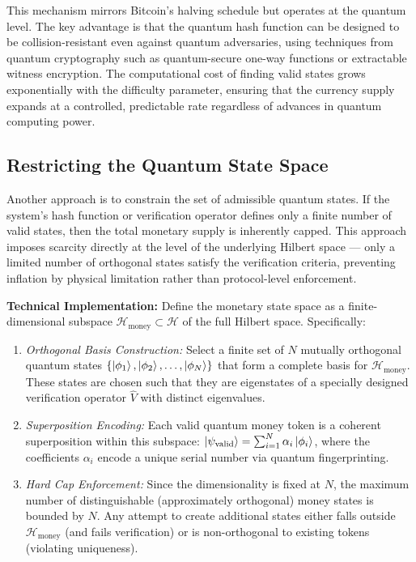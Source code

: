 \documentclass[a4paper,10.5pt,twoside]{article}
\begin{document}
This mechanism mirrors Bitcoin's halving schedule but operates at the quantum level. The key advantage is that the quantum hash function can be designed to be collision-resistant even against quantum adversaries, using techniques from quantum cryptography such as quantum-secure one-way functions or extractable witness encryption. The computational cost of finding valid states grows exponentially with the difficulty parameter, ensuring that the currency supply expands at a controlled, predictable rate regardless of advances in quantum computing power.

\subsection{Restricting the Quantum State Space}\label{s:3.2}
Another approach is to constrain the set of admissible quantum states. If the system's hash function or verification operator defines only a finite number of valid states, then the total monetary supply is inherently capped. This approach imposes scarcity directly at the level of the underlying Hilbert space — only a limited number of orthogonal states satisfy the verification criteria, preventing inflation by physical limitation rather than protocol-level enforcement.

\textbf{Technical Implementation:} Define the monetary state space as a finite-dimensional subspace $\mathcal{H}_{\text{money}} \subset \mathcal{H}$ of the full Hilbert space. Specifically:
\begin{enumerate}
\item \textit{Orthogonal Basis Construction:} Select a finite set of $N$ mutually orthogonal quantum states $\{\ket{\phi_1}, \ket{\phi_2}, \ldots, \ket{\phi_N}\}$ that form a complete basis for $\mathcal{H}_{\text{money}}$. These states are chosen such that they are eigenstates of a specially designed verification operator $\hat{V}$ with distinct eigenvalues.
\item \textit{Superposition Encoding:} Each valid quantum money token is a coherent superposition within this subspace: $\ket{\psi_{\text{valid}}} = \sum_{i=1}^{N} \alpha_i \ket{\phi_i}$, where the coefficients $\alpha_i$ encode a unique serial number via quantum fingerprinting.
\item \textit{Hard Cap Enforcement:} Since the dimensionality is fixed at $N$, the maximum number of distinguishable (approximately orthogonal) money states is bounded by $N$. Any attempt to create additional states either falls outside $\mathcal{H}_{\text{money}}$ (and fails verification) or is non-orthogonal to existing tokens (violating uniqueness).
\end{enumerate}
\end{document}
